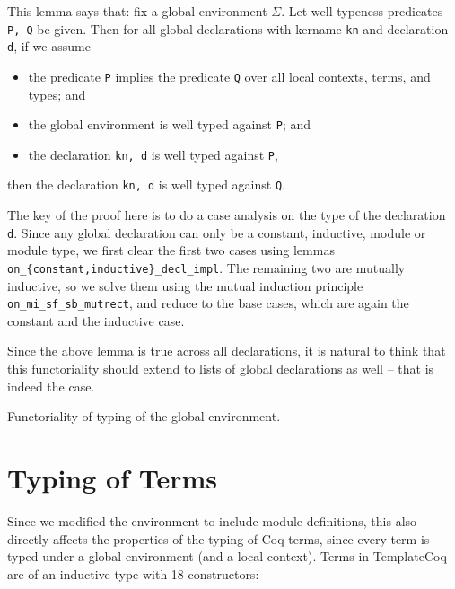 This lemma says that: fix a global environment $\Sigma$. Let well-typeness
predicates \verb|P, Q| be given. Then for all global declarations with kername
\verb|kn| and declaration \verb|d|, if we assume
\begin{itemize}
  \item the predicate \verb|P| implies the predicate \verb|Q| over all local
  contexts, terms, and types; and
  \item the global environment is well typed against \verb|P|; and
  \item the declaration \verb|kn, d| is well typed against \verb|P|, 
\end{itemize}
then the declaration \verb|kn, d| is well typed against \verb|Q|.

The key of the proof here is to do a case analysis on the type of the
declaration \verb|d|. Since any global declaration can only be a constant,
inductive, module or module type, we first clear the first two cases using
lemmas \verb|on_{constant,inductive}_decl_impl|. The remaining two are mutually
inductive, so we solve them using the mutual induction principle
\verb|on_mi_sf_sb_mutrect|, and reduce to the base cases, which are again the
constant and the inductive case.


Since the above lemma is true across all declarations, it is natural to think
that this functoriality should extend to lists of global declarations as
well -- that is indeed the case.

\begin{listing}[H]
  \caption{Functoriality of typing of the global environment.}
  \label{lst:1-typ-funct-env}
\end{listing}



\section{Typing of Terms}
Since we modified the environment to include module definitions, this also
directly affects the properties of the typing of Coq terms, since every term is
typed under a global environment (and a local context). Terms in TemplateCoq are
of an inductive type with 18 constructors:

